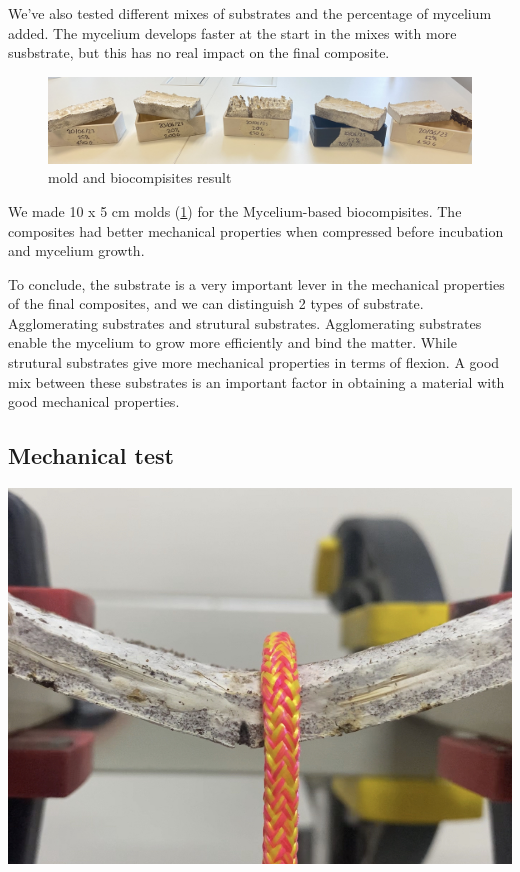 We've also tested different mixes of substrates and the percentage of mycelium added. The mycelium develops faster at the start in the mixes with more susbstrate, but this has no real impact on the final composite. 


\begin{figure}[h!]
    \centering
    \includegraphics{images/moule et MBC.jpg}
    \caption{mold and biocompisites result} 
    \label{fig:moldandresult}
\end{figure} 
We made 10 x 5 cm molds (\ref{fig:moldandresult}) for the Mycelium-based biocompisites. The composites had better mechanical properties when compressed before incubation and mycelium growth. 

To conclude, the substrate is a very important lever in the mechanical properties of the final composites, and we can distinguish 2 types of substrate.  Agglomerating substrates and strutural substrates. 
Agglomerating substrates enable the mycelium to grow more efficiently and bind the matter.
While strutural substrates give more mechanical properties in terms of flexion. A good mix between these substrates is an important factor in obtaining a material with good mechanical properties. 


\subsection{Mechanical test}

\begin{marginfigure}
    \centering
    \includegraphics{images/IMG_3508.jpg}
    \caption{}
    \label{fig:mech1}
\end{marginfigure}

